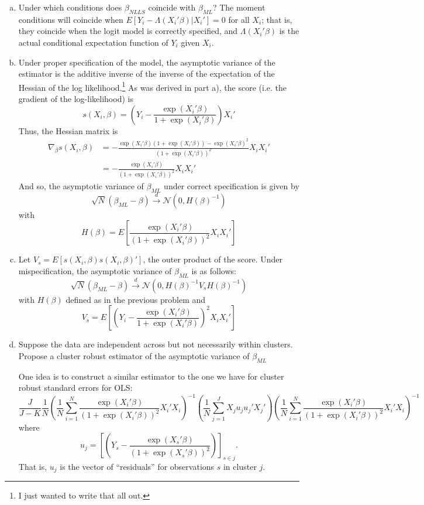 \documentclass[11pt]{article}
\begin{document}
\begin{enumerate}[a)]
	\item Under which conditions does $\beta_{NLLS}$ coincide with $\beta_{ML}$? The moment conditions will coincide when $E[Y_i - \Lambda(X_i'\beta) | X_i'] = 0$ for all $X_i$; that is, they coincide when the logit model is correctly specified, and $\Lambda(X_i'\beta)$ is the actual conditional expectation function of $Y_i$ given $X_i$.

	\item
	Under proper specification of the model, the asymptotic variance of the estimator is the additive inverse of the inverse of the expectation of the Hessian of the log likelihood.\footnote{I just wanted to write that all out.} As was derived in part a), the score (i.e. the gradient of the log-likelihood) is
	$$s(X_i,\beta) = \left(Y_i - \frac{\exp(X_i' \beta)}{1 + \exp(X_i'\beta)}\right)X_i'$$
	Thus, the Hessian matrix is 
	\begin{align*}
	\nabla_\beta s(X_i,\beta) & = -\frac{\exp(X_i'\beta)(1+\exp(X_i'\beta)) - \exp(X_i'\beta)^2}{(1+\exp(X_i'\beta))^2}X_i X_i' \\
	& = -\frac{\exp(X_i'\beta)}{(1+ \exp(X_i'\beta))^2}X_iX_i'
	\end{align*}
	And so, the asymptotic variance of $\beta_{ML}$ under correct specification is given by
	$$\sqrt{N}(\beta_{ML} - \beta) \overset{d}{\to} \mathcal{N}(0,H(\beta)^{-1})$$
	with
	$$H(\beta) = E\left[\frac{\exp(X_i'\beta)}{(1+ \exp(X_i'\beta))^2}X_iX_i'\right]$$

	\item Let $V_s = E\left[s(X_i,\beta)s(X_i,\beta)'\right]$, the outer product of the score. Under mispecification, the asymptotic variance of $\beta_{ML}$ is as follows:
	$$\sqrt{N}(\beta_{ML} - \beta) \overset{d}{\to} \mathcal{N}\left(0,H(\beta)^{-1}V_{s}H(\beta)^{-1}\right)$$
	with $H(\beta)$ defined as in the previous problem and 
	$$V_s = E\left[\left(Y_i - \frac{\exp(X_i'\beta)}{1+\exp(X_i'\beta)}\right)^2X_i X_i'\right]$$

	\item Suppose the data are independent across but not necessarily within clusters. Propose a cluster robust estimator of the asymptotic variance of $\beta_{ML}$

	One idea is to construct a similar estimator to the one we have for cluster robust standard errors for OLS:
	$$\frac{J}{J-K}\frac{1}{N}\left(\frac{1}{N}\sum_{i=1}^N \frac{\exp(X_i'\beta)}{(1+\exp(X_i'\beta))^2}X_i' X_i \right)^{-1} 
	\left(\frac{1}{N} \sum_{j=1}^{J}X_j u_j u_j' X_j'\right)\left(\frac{1}{N}\sum_{i=1}^N \frac{\exp(X_i'\beta)}{(1+\exp(X_i'\beta))^2}X_i' X_i \right)^{-1} $$
	where $$u_j = \left[\left(Y_s - \frac{\exp(X_s'\beta)}{(1+\exp(X_s'\beta))^2}\right)\right]_{s \in j}.$$
	That is, $u_j$ is the vector of ``residuals'' for observations $s$ in cluster $j$.
\end{enumerate}
\end{document}
